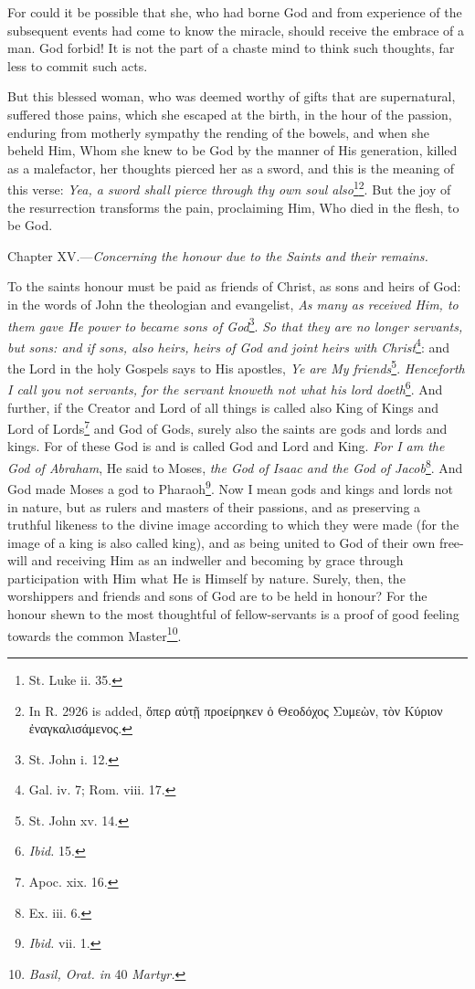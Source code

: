 For could it be possible that she, who had borne God and from experience of the subsequent events had come to know the miracle, should receive the embrace of a man. God forbid! It is not the part of a chaste mind to think such thoughts, far less to commit such acts.

But this blessed woman, who was deemed worthy of gifts that are supernatural, suffered those pains, which she escaped at the birth, in the hour of the passion, enduring from motherly sympathy the rending of the bowels, and when she beheld Him, Whom she knew to be God by the manner of His generation, killed as a malefactor, her thoughts pierced her as a sword, and this is the meaning of this verse: \emph{Yea, a sword shall pierce through thy own soul also}\footnote{St. Luke ii. 35.}\textsuperscript{}\footnote{In R. 2926 is added, \textgreek{ὅπερ αὐτῇ προείρηκεν ὁ Θεοδόχος Συμεὼν, τὸν Κύριον ἐναγκαλισάμενος}.}\textsuperscript{}. But the joy of the resurrection transforms the pain, proclaiming Him, Who died in the flesh, to be God.


Chapter XV.—\emph{Concerning the honour due to the Saints and their remains.}

To the saints honour must be paid as friends of Christ, as sons and heirs of God: in the words of John the theologian and evangelist, \emph{As many as received Him, to them gave He power to became sons of God}\footnote{St. John i. 12.}. \emph{So that they are no longer servants, but sons: and if sons, also heirs, heirs of God and joint heirs with Christ}\footnote{Gal. iv. 7; Rom. viii. 17.}: and the Lord in the holy Gospels says to His apostles, \emph{Ye are My friends}\footnote{St. John xv. 14.}.\emph{ Henceforth I call you not servants, for the servant knoweth not what his lord doeth}\footnote{\emph{Ibid.} 15.}. And further, if the Creator and Lord of all things is called also King of Kings and Lord of Lords\footnote{Apoc. xix. 16.} and God of Gods, surely also the saints are gods and lords and kings. For of these God is and is called God and Lord and King. \emph{For I am the God of Abraham}, He said to Moses, \emph{the God of Isaac and the God of Jacob}\footnote{Ex. iii. 6.}. And God made Moses a god to Pharaoh\footnote{\emph{Ibid.} vii. 1.}. Now I mean gods and kings and lords not in nature, but as rulers and masters of their passions, and as preserving a truthful likeness to the divine image according to which they were made (for the image of a king is also called king), and as being united to God of their own free-will and receiving Him as an indweller and becoming by grace through participation with Him what He is Himself by nature. Surely, then, the worshippers and friends and sons of God are to be held in honour? For the honour shewn to the most thoughtful of fellow-servants is a proof of good feeling towards the common Master\footnote{\emph{Basil, Orat. in }40 \emph{Martyr.}}.

